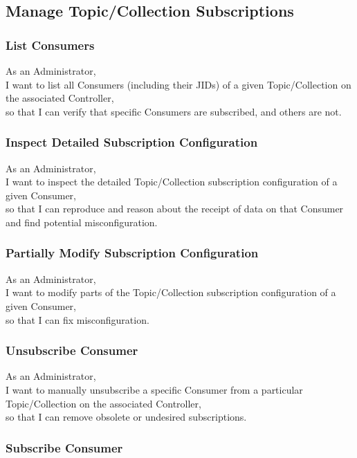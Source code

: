 \subsection{Manage Topic/Collection Subscriptions}

\subsubsection{List Consumers}

As an Administrator, \\
I want to list all Consumers (including their JIDs) of a given Topic/Collection on the associated Controller, \\
so that I can verify that specific Consumers are subscribed, and others are not.


\subsubsection{Inspect Detailed Subscription Configuration}

As an Administrator, \\
I want to inspect the detailed Topic/Collection subscription configuration of a given Consumer, \\
so that I can reproduce and reason about the receipt of data on that Consumer
and find potential misconfiguration.

\subsubsection{Partially Modify Subscription Configuration}

As an Administrator, \\
I want to modify parts of the Topic/Collection subscription configuration of a given Consumer, \\
so that I can fix misconfiguration.

\subsubsection{Unsubscribe Consumer}

As an Administrator, \\
I want to manually unsubscribe a specific Consumer from a particular Topic/Collection on the associated Controller, \\
so that I can remove obsolete or undesired subscriptions.

\subsubsection{Subscribe Consumer}

